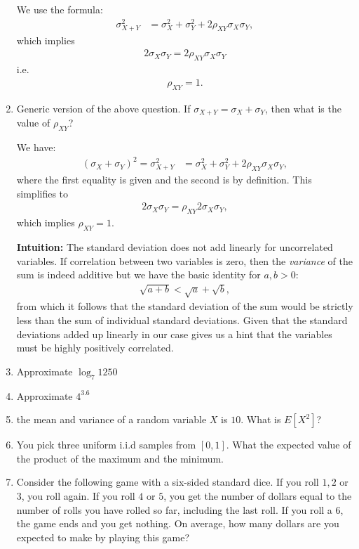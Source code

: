 \documentclass{amsart}
\theoremstyle{plain}
\numberwithin{equation}{section}
\begin{document}
\begin{enumerate}
We use the formula:
\begin{align*}
\sigma_{X+Y}^2 &= \sigma_{X}^2 + \sigma_{Y}^2 + 2 \rho_{XY} \sigma_X \sigma_Y,
\end{align*}
which implies
\begin{align*}
2 \sigma_X \sigma_Y = 
2 \rho_{XY} \sigma_X \sigma_Y
\end{align*}
i.e.\,
\begin{align*}
\rho_{XY} = 1.
\end{align*}

\item Generic version of the above question. If 
$\sigma_{X+Y} = \sigma_X + \sigma_Y$, then what is the 
value of $\rho_{XY}$?

We have:
\begin{align*}
(\sigma_X + \sigma_Y)^2 = \sigma_{X+Y}^2 &= \sigma_{X}^2 + \sigma_{Y}^2 + 
2 \rho_{XY} \sigma_X \sigma_Y,
\end{align*}
where the first equality is given and the second is by 
definition. This simplifies to 
\begin{align*}
2\sigma_X \sigma_Y = \rho_{XY} 2\sigma_X \sigma_Y,
\end{align*}
which implies $\rho_{XY} = 1$.

\textbf{Intuition:} The standard deviation
does not add linearly for uncorrelated variables. 
If correlation between two variables is zero, then 
the \emph{variance} of the sum is indeed additive
but we have the basic identity for $a, b>0$:
\begin{align*}
\sqrt{a + b}<\sqrt{a} + \sqrt{b},
\end{align*}
from which it follows that the standard deviation of 
the sum would be
strictly less than the sum of individual 
standard deviations. Given that the standard 
deviations added up linearly in our case gives us 
a hint that the variables must be highly positively correlated. 


\item Approximate $\log_{7}1250$ 

\item Approximate $4^{3.6}$

\item the mean and variance of a random variable $X$ is $10$. What is
$E[X^2]$?

\item You pick three uniform i.i.d samples from $[0,1]$. What the 
expected value of the product of the maximum and the minimum.

\item Consider the following game with a six-sided standard dice. 
If you roll $1,2$ or $3$, you roll again. If you 
roll $4$ or $5$, you get the number of dollars equal 
to the number of rolls you have rolled so far, including the last
roll. If you roll a $6$, the game ends and you get nothing. On 
average, how many dollars are you expected to make by 
playing this game?


\end{enumerate}
\end{document}
